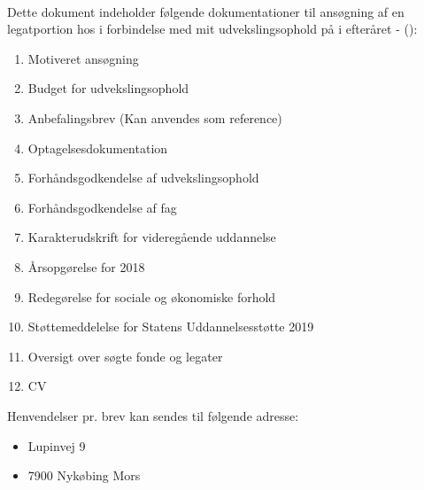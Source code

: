 \documentclass[../Ansoegning.tex]{subfiles}
\begin{document}
\thispagestyle{empty}

\begin{center}
    {\textbf{{\LARGE{\ToFondNavn}}} \\ \Dato}
\end{center}

Dette dokument indeholder følgende dokumentationer til ansøgning af en legatportion hos \textit{\FondNavn} i forbindelse med mit udvekslingsophold på \textit{\NTU} i efteråret { \Fra - \Til } (\Periode):
\begin{enumerate}
    \item Motiveret ansøgning
    \item Budget for udvekslingsophold
    \item Anbefalingsbrev (Kan anvendes som reference)
    \item Optagelsesdokumentation
    \item Forhåndsgodkendelse af udvekslingsophold
    \item Forhåndsgodkendelse af fag
    \item Karakterudskrift for videregående uddannelse
    \item Årsopgørelse for 2018
    \item Redegørelse for sociale og økonomiske forhold
    \item Støttemeddelelse for Statens Uddannelsesstøtte 2019
    \item Oversigt over søgte fonde og legater
    \item CV
\end{enumerate}

Henvendelser pr. brev kan sendes til følgende adresse:
\begin{itemize}
    \item[] Lupinvej 9
    \item[] 7900 Nykøbing Mors
\end{itemize}
\end{document}

